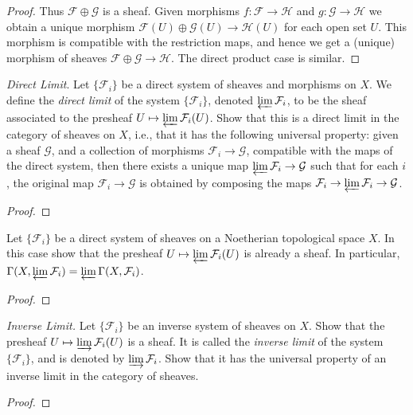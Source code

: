 \begin{problemset}
\begin{proof}
Thus $\mathcal F\oplus \mathcal G$ is a sheaf. Given morphisms $f:\mathcal F\to \mathcal H$ and $g:\mathcal G\to \mathcal H$ we obtain a unique morphism $\mathcal F(U)\oplus \mathcal G(U) \to \mathcal H(U)$ for each open set $U$. This morphism is compatible with the restriction maps, and hence we get a (unique) morphism of sheaves $\mathcal F\oplus\mathcal G\to \mathcal H$. The direct product case is similar. 
\end{proof}
\item \emph{Direct Limit}. Let $\{\mathcal F_i\}$ be a direct system of sheaves and morphisms on $X$. We define the \emph{direct limit} of the system $\{\mathcal F_i\}$, denoted $\varprojlim \mathcal F_i$, to be the sheaf associated to the presheaf $U\mapsto \varprojlim \mathcal F_i(U)$. Show that this is a direct limit in the category of sheaves on $X$, i.e., that it has the following universal property: given a sheaf $\mathcal G$, and a collection of morphisms $\mathcal F_i \to \mathcal G$, compatible with the maps of the direct system, then there exists a unique map $\varprojlim \mathcal F_i \to \mathcal G$ such that for each $i$, the original map $\mathcal F_i \to \mathcal G$ is obtained by composing the maps $\mathcal F_i\to \varprojlim \mathcal F_i \to \mathcal G$.
	\begin{proof}
		
	\end{proof}
\item Let $\{\mathcal F_i\}$ be a direct system of sheaves on a Noetherian topological space $X$. In this case show that the presheaf $U\mapsto \varprojlim \mathcal F_i(U)$ is already a sheaf. In particular, $\Gamma(X,\varprojlim \mathcal F_i) = \varprojlim \Gamma(X,\mathcal F_i)$.
	\begin{proof}
		
	\end{proof}
\item \emph{Inverse Limit.} Let $\{\mathcal F_i\}$ be an inverse system of sheaves on $X$. Show that the presheaf $U\mapsto \varinjlim \mathcal F_i(U)$ is a sheaf. It is called the \emph{inverse limit} of the system $\{\mathcal F_i\}$, and is denoted by $\varinjlim \mathcal F_i$. Show that it has the universal property of an inverse limit in the category of sheaves.
	\begin{proof}
		
	\end{proof}


\end{problemset}

